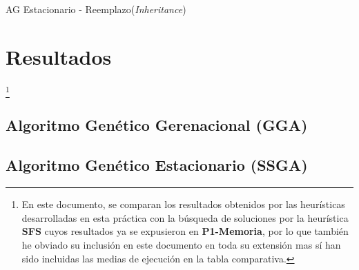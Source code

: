 \documentclass[a4paper, 11pt]{article}
\begin{document}
			
			\begin{algorithm}[H]
				\begin{algorithmic}[1]
				\REQUIRE \ \\
						 \
						
						\ENDIF
					\ENDFOR
					
							\ENDIF
						\ENDIF
						
					\ENDWHILE
				\ENDWHILE
				\end{algorithmic}
			\caption{AG Estacionario - Reemplazo(\textit{Inheritance})}
			\label{SSGA-Inher}
			\end{algorithm}
			
		
	\section{Resultados}\footnote{En este documento, se comparan los resultados obtenidos por las
	heurísticas desarrolladas en esta práctica con la búsqueda de soluciones por la heurística
	\textbf{SFS} cuyos resultados ya se expusieron en \textbf{P1-Memoria}, por lo que también he
	obviado su inclusión en este documento en toda su extensión mas sí han sido incluidas las medias
	de ejecución en la tabla comparativa.}
		\subsection{Algoritmo Genético Gerenacional (\textbf{GGA})}
			
			
			
		\subsection{Algoritmo Genético Estacionario (\textbf{SSGA})}
			
			
			
			
\end{document}
